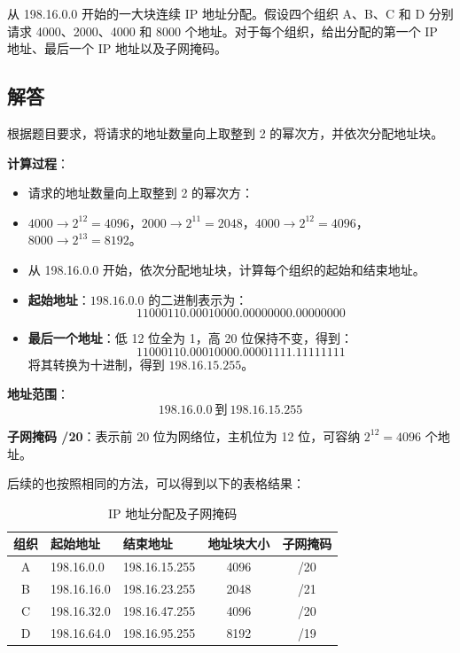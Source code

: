 从 198.16.0.0 开始的一大块连续 IP 地址分配。假设四个组织 A、B、C 和 D 分别请求 4000、2000、4000 和 8000 个地址。对于每个组织，给出分配的第一个 IP 地址、最后一个 IP 地址以及子网掩码。

\subsection*{解答}

根据题目要求，将请求的地址数量向上取整到 2 的幂次方，并依次分配地址块。

\noindent \textbf{计算过程}：
\begin{itemize}
  \item 请求的地址数量向上取整到 2 的幂次方：
  \item 
  \( 4000 \to 2^{12} = 4096 \)，\( 2000 \to 2^{11} = 2048 \)，\( 4000 \to 2^{12} = 4096 \)，\( 8000 \to 2^{13} = 8192 \)。
  \item 从 198.16.0.0 开始，依次分配地址块，计算每个组织的起始和结束地址。
\end{itemize}

\begin{itemize}
  \item \textbf{起始地址}：\( 198.16.0.0 \) 的二进制表示为：
  \[
  11000110.00010000.00000000.00000000
  \]
  \item \textbf{最后一个地址}：低 12 位全为 1，高 20 位保持不变，得到：
  \[
  11000110.00010000.00001111.11111111
  \]
  将其转换为十进制，得到 \( 198.16.15.255 \)。
\end{itemize}

\noindent \textbf{地址范围}：  
\[
198.16.0.0 \ \text{到} \ 198.16.15.255
\]

\noindent \textbf{子网掩码 /20}：表示前 20 位为网络位，主机位为 12 位，可容纳 \( 2^{12} = 4096 \) 个地址。

后续的也按照相同的方法，可以得到以下的表格结果：

\begin{table}[H]
  \centering
  \renewcommand{\arraystretch}{1.2}
  \begin{tabular}{|c|l|l|c|c|}
    \hline
    \textbf{组织} & \textbf{起始地址} & \textbf{结束地址} & \textbf{地址块大小} & \textbf{子网掩码} \\ \hline
    A   & 198.16.0.0    & 198.16.15.255   & 4096  & /20 \\ \hline
    B   & 198.16.16.0   & 198.16.23.255   & 2048  & /21 \\ \hline
    C   & 198.16.32.0   & 198.16.47.255   & 4096  & /20 \\ \hline
    D   & 198.16.64.0   & 198.16.95.255   & 8192  & /19 \\ \hline
  \end{tabular}
  \caption{IP 地址分配及子网掩码}
  \label{tab:ip_allocation}
\end{table}

